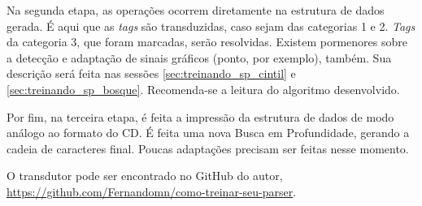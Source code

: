 Na segunda etapa, as operações ocorrem diretamente na estrutura de dados gerada. É aqui que as \textit{tags} são transduzidas, caso sejam das categorias 1 e 2. \textit{Tags} da categoria 3, que foram marcadas, serão resolvidas. 
Existem pormenores sobre a detecção e adaptação de sinais gráficos (ponto, por exemplo), também.
Sua descrição será feita nas sessões \ref{sec:treinando_sp_cintil} e \ref{sec:treinando_sp_bosque}. Recomenda-se a leitura do algoritmo desenvolvido.

Por fim, na terceira etapa, é feita a impressão da estrutura de dados de modo análogo ao formato do CD. É feita uma nova Busca em Profundidade, gerando a cadeia de caracteres final. Poucas adaptações precisam ser feitas nesse momento.

O transdutor pode ser encontrado no GitHub do autor, \url{https://github.com/Fernandomn/como-treinar-seu-parser}.
